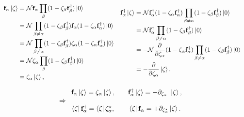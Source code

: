\begin{equation} \begin{array}{cc}
    \begin{split}
        {\bf f}_{\alpha} \ket{\zeta} &= \mathcal{N} {\bf f}_{\alpha} \prod_{\beta}  (1-\zeta_{\beta} {\bf f}_{\beta}^\dagger) \ket{0} \\
        & = \mathcal{N} \prod_{\beta \neq \alpha}  (1-\zeta_{\beta} {\bf f}_{\beta}^\dagger) {\bf f}_{\alpha}  (1-\zeta_{\alpha} {\bf f}_{\alpha}^\dagger) \ket{0} \\
        &= \mathcal{N} \prod_{\beta \neq \alpha}  (1-\zeta_{\beta} {\bf f}_{\beta}^\dagger) {\zeta}_{\alpha} (1-\zeta_{\alpha} {\bf f}_{\alpha}^\dagger) \ket{0} \\
        &= \mathcal{N} \zeta_{\alpha} \prod_{\beta}  (1-\zeta_{\beta} {\bf f}_{\beta}^\dagger) \ket{0} \\
        &= \zeta_{\alpha} \ket{\zeta},
    \end{split} & \begin{split}
         {\bf f}_{\alpha}^\dagger \ket{\zeta} 
         &= \mathcal{N}{\bf f}_{\alpha}^\dagger (1-\zeta_{\alpha} {\bf f}_{\alpha}^\dagger) \prod_{\beta \neq \alpha} (1-\zeta_{\beta} {\bf f}_{\beta}^\dagger) \ket{0} \\
         &= \mathcal{N}{\bf f}_{\alpha}^\dagger \prod_{\beta \neq \alpha} (1-\zeta_{\beta} {\bf f}_{\beta}^\dagger) \ket{0} \\
         &= - \mathcal{N}\frac{\partial}{\partial \zeta_\alpha} (1- \zeta_{\alpha} {\bf f}_{\alpha}^\dagger) \prod_{\beta \neq \alpha} (1-\zeta_{\beta} {\bf f}_{\beta}^\dagger) \ket{0} \\
         &= - \frac{\partial}{\partial \zeta_\alpha} \ket{\zeta}.
    \end{split} 
\end{array} 
\end{equation}

\begin{equation}
    \Rightarrow \begin{array}{ccc}
    {{\bf f}}_{\alpha} \ket{\zeta} = \zeta_\alpha \ket{\zeta}, &  & {{\bf f}}_{\alpha}^\dagger \ket{\zeta} = - \partial_{\zeta_\alpha} \textnormal{ } \ket{\zeta},  \\ 
    \\
    \bra{\zeta} {{\bf f}}_{\alpha}^\dagger = \bra{\zeta} \zeta_\alpha^\star, & & \bra{\zeta} {{\bf f}}_{\alpha} = + \partial_{\zeta_\alpha^\star} \ket{\zeta}. \end{array}
\end{equation}

